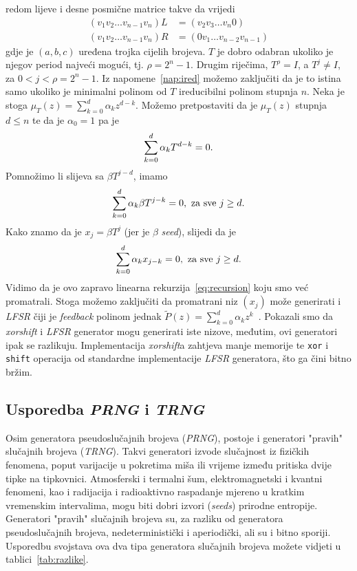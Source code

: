 \documentclass[10pt]{scrartcl}
\newcommand\foreign[1]{\textit{#1}}
\newcommand{\minpol}[2]{\mu_{#1}(#2)}
\newcommand{\sumk}{\sum_{k=0}^{d}}
\begin{document}
redom lijeve i desne posmične matrice takve da vrijedi
\begin{align}
(v_1v_2 \dots v_{n-1}v_n)L &= (v_2v_3 \dots v_n0)\\
(v_1v_2 \dots v_{n-1}v_n)R &= (0v_1 \dots v_{n-2}v_{n-1})
\end{align}
gdje je $(a,b,c)$ uređena trojka cijelih brojeva.
$T$ je dobro odabran ukoliko je njegov period najveći mogući, tj. $\rho = 2^n -1$. Drugim riječima, $T^{\rho} = I$, a $T^j \neq I$, za $0<j<\rho = 2^n -1$. Iz napomene~\ref{nap:ired} možemo zaključiti da je to istina samo ukoliko je minimalni polinom od $T$ ireducibilni polinom stupnja $n$. Neka je stoga $\minpol{T}{z} = \sum_{k=0}^{d} \alpha_k z^{d-k}$. Možemo pretpostaviti da je $\minpol{T}{z}$ stupnja $d \leq n$ te da je $\alpha_0 = 1$ pa je
\begin{equation}
    \sumk \alpha_k T^{d-k} = 0\text.
\end{equation}
Pomnožimo li slijeva sa $\beta T^{j-d}$, imamo
\begin{equation}
    \sumk \alpha_k \beta T^{j-k} = 0, \text{ za sve } j \geq d\text.
\end{equation}
Kako znamo da je $x_j = \beta T^j$ (jer je $\beta$ \foreign{seed}), slijedi da je
\begin{equation}
    \sumk\alpha_k x_{j-k} = 0, \text{ za sve } j \geq d\text.
\end{equation}
Vidimo da je ovo zapravo linearna rekurzija~\eqref{eq:recursion} koju smo već promatrali. Stoga možemo zaključiti da promatrani niz $(x_j)$ može generirati i \foreign{LFSR} čiji je \foreign{feedback} polinom jednak $\widetilde{P}(z) = \sumk \alpha_k z^k$~\cite{article}. Pokazali smo da \foreign{xorshift} i \foreign{LFSR} generator mogu generirati iste nizove, međutim, ovi generatori ipak se razlikuju. Implementacija \foreign{xorshift}a zahtjeva manje memorije te \texttt{xor} i \texttt{shift} operacija od standardne implementacije \foreign{LFSR} generatora, što ga čini bitno bržim.

\subsection{Usporedba \emph{PRNG} i \emph{TRNG}}
Osim generatora pseudoslučajnih brojeva (\foreign{PRNG}), postoje i generatori "pravih" slučajnih brojeva (\foreign{TRNG}). Takvi generatori izvode slučajnost iz fizičkih fenomena, poput varijacije u pokretima miša ili vrijeme između pritiska dvije tipke na tipkovnici. Atmosferski i termalni šum, elektromagnetski i kvantni fenomeni, kao i radijacija i radioaktivno raspadanje mjereno u kratkim vremenskim intervalima, mogu biti dobri izvori (\foreign{seeds}) prirodne entropije. Generatori "pravih" slučajnih brojeva su, za razliku od generatora pseudoslučajnih brojeva, nedeterministički i aperiodički, ali su i bitno sporiji. Usporedbu svojstava ova dva tipa generatora slučajnih brojeva možete vidjeti u tablici~\ref{tab:razlike}.
\end{document}
